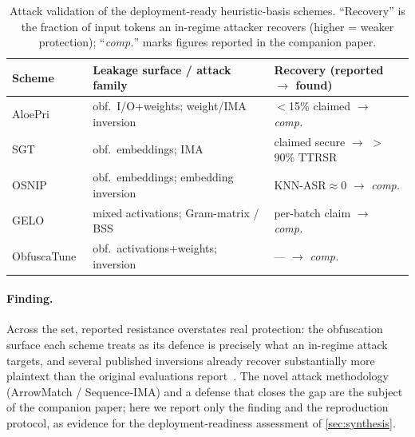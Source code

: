 \begin{table}[t!]
  \centering \footnotesize
  \caption{Attack validation of the deployment-ready heuristic-basis schemes. ``Recovery'' is the
    fraction of input tokens an in-regime attacker recovers (higher = weaker protection);
    ``\emph{comp.}'' marks figures reported in the companion paper.}
  \label{tab:validation}
  \begin{tabular*}{\textwidth}{@{\extracolsep{\fill}}lll@{}}
    \toprule
    Scheme & Leakage surface / attack family & Recovery (reported $\to$ found) \\
    \midrule
    AloePri~\cite{lin_aloepri}            & obf.\ I/O+weights; weight/IMA inversion & $<$15\% claimed $\to$ \emph{comp.} \\
    SGT~\cite{roberts_sgt}                & obf.\ embeddings; IMA                   & claimed secure $\to$ $>$90\% TTRSR~\cite{lin_aloepri} \\
    OSNIP~\cite{cao_osnip}                & obf.\ embeddings; embedding inversion   & KNN-ASR$\approx$0 $\to$ \emph{comp.} \\
    GELO~\cite{belikov_gelo}              & mixed activations; Gram-matrix / BSS    & per-batch claim $\to$ \emph{comp.} \\
    ObfuscaTune~\cite{frikha_obfuscatune} & obf.\ activations+weights; inversion    & --- $\to$ \emph{comp.} \\
    \bottomrule
  \end{tabular*}
\end{table}

\paragraph{Finding.} Across the set, reported resistance overstates real protection: the
obfuscation surface each scheme treats as its defence is precisely what an in-regime attack
targets, and several published inversions already recover substantially more plaintext than the
original evaluations report~\citep{lin_inversion,hnm,arrowmatch,tsqp,depth_false_privacy}. The
novel attack methodology (ArrowMatch / Sequence-IMA) and a defense that closes the gap are the
subject of the companion paper; here we report only the finding and the reproduction protocol,
as evidence for the deployment-readiness assessment of \cref{sec:synthesis}.
